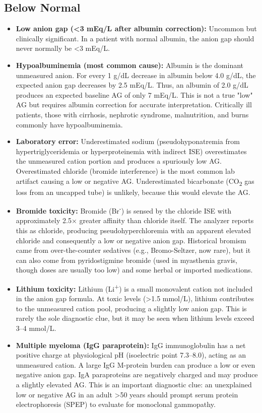 \subsection*{Below Normal}
\begin{itemize}
  \item \textbf{Low anion gap (<3 mEq/L after albumin correction):} Uncommon but clinically significant. In a patient with normal albumin, the anion gap should never normally be <3 mEq/L.
  \item \textbf{Hypoalbuminemia (most common cause):} Albumin is the dominant unmeasured anion. For every 1 g/dL decrease in albumin below 4.0 g/dL, the expected anion gap decreases by 2.5 mEq/L. Thus, an albumin of 2.0 g/dL produces an expected baseline AG of only 7 mEq/L. This is not a true "low" AG but requires albumin correction for accurate interpretation. Critically ill patients, those with cirrhosis, nephrotic syndrome, malnutrition, and burns commonly have hypoalbuminemia.
  \item \textbf{Laboratory error:} Underestimated sodium (pseudohyponatremia from hypertriglyceridemia or hyperproteinemia with indirect ISE) overestimates the unmeasured cation portion and produces a spuriously low AG. Overestimated chloride (bromide interference) is the most common lab artifact causing a low or negative AG. Underestimated bicarbonate (CO\textsubscript{2} gas loss from an uncapped tube) is unlikely, because this would elevate the AG.
  \item \textbf{Bromide toxicity:} Bromide (Br\textsuperscript{-}) is sensed by the chloride ISE with approximately 2.5$\times$ greater affinity than chloride itself. The analyzer reports this as chloride, producing pseudohyperchloremia with an apparent elevated chloride and consequently a low or negative anion gap. Historical bromism came from over-the-counter sedatives (e.g., Bromo-Seltzer, now rare), but it can also come from pyridostigmine bromide (used in myasthenia gravis, though doses are usually too low) and some herbal or imported medications.
  \item \textbf{Lithium toxicity:} Lithium (Li\textsuperscript{+}) is a small monovalent cation not included in the anion gap formula. At toxic levels (>1.5 mmol/L), lithium contributes to the unmeasured cation pool, producing a slightly low anion gap. This is rarely the sole diagnostic clue, but it may be seen when lithium levels exceed 3--4 mmol/L.
  \item \textbf{Multiple myeloma (IgG paraprotein):} IgG immunoglobulin has a net positive charge at physiological pH (isoelectric point 7.3--8.0), acting as an unmeasured cation. A large IgG M-protein burden can produce a low or even negative anion gap. IgA paraproteins are negatively charged and may produce a slightly elevated AG. This is an important diagnostic clue: an unexplained low or negative AG in an adult >50 years should prompt serum protein electrophoresis (SPEP) to evaluate for monoclonal gammopathy.

\end{itemize}
